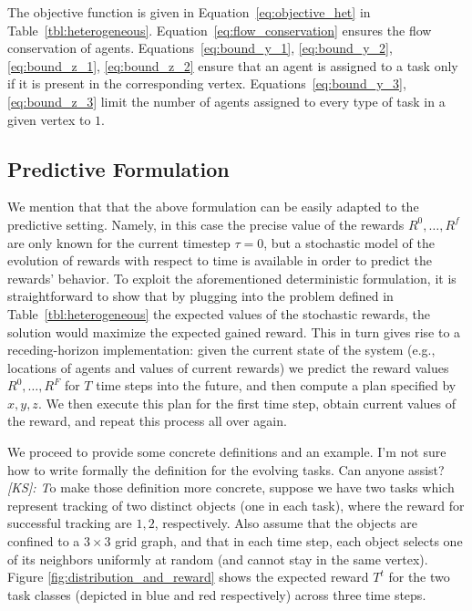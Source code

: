 \documentclass[conference]{IEEEtran}
\newcommand{\ksline}[2]{{\color{blue}#1}{\em \color{blue}[KS]: #2}}
\newcommand{\todo}[1]{{\color{red}{\bf TODO:} #1}}
\newcommand{\ksline}[2]{#1}
\newcommand{\todo}[1]{}
\begin{document}
The objective function is given in Equation~\eqref{eq:objective_het} in Table~\ref{tbl:heterogeneous}. Equation~\eqref{eq:flow_conservation} ensures the flow conservation of agents. 
Equations~\eqref{eq:bound_y_1}, \eqref{eq:bound_y_2}, \eqref{eq:bound_z_1}, \eqref{eq:bound_z_2} ensure that an agent is assigned to a task only if it is present in the corresponding vertex.    Equations~\eqref{eq:bound_y_3}, \eqref{eq:bound_z_3} limit the number of agents assigned to every type of task in a given vertex to $1$. 

\subsection{Predictive Formulation}\label{sec:predictive}
We mention that that the above formulation can be easily adapted to the predictive setting. Namely, in this case the precise value of the rewards $R^0,\ldots,R^f$ are only known for the current timestep $\tau=0$, but a stochastic model of the evolution of rewards with respect to time is available in order to predict the rewards' behavior. To exploit the aforementioned deterministic formulation, it is straightforward to show that by plugging into the problem defined in Table~\ref{tbl:heterogeneous} the expected values of the stochastic rewards, the solution would maximize the expected gained reward. This in turn gives rise to a receding-horizon implementation: given the current state of the system (e.g., locations of agents and values of current rewards) we predict the reward values $R^0,\ldots,R^F$ for $T$ time steps into the future, and then compute a plan specified by $x,y,z$. We then execute this plan for the first time step, obtain current values of the reward, and repeat this process all over again. 

We proceed to provide some concrete definitions and an example.
\ksline{I'm not sure how to write formally the definition for the evolving tasks. Can anyone assist?}

To make those definition more concrete, suppose we have two tasks which represent tracking of two distinct objects (one in each task), where the reward for successful tracking are $1, 2$, respectively. Also assume that the objects are confined to a $3\times 3$ grid graph, and that in each time step, each object selects one of its neighbors uniformly at random (and cannot stay in the same vertex). Figure \ref{fig:distribution_and_reward} shows the expected reward $T^t$ for the two task classes (depicted in blue and red respectively) across three time steps.
\end{document}
